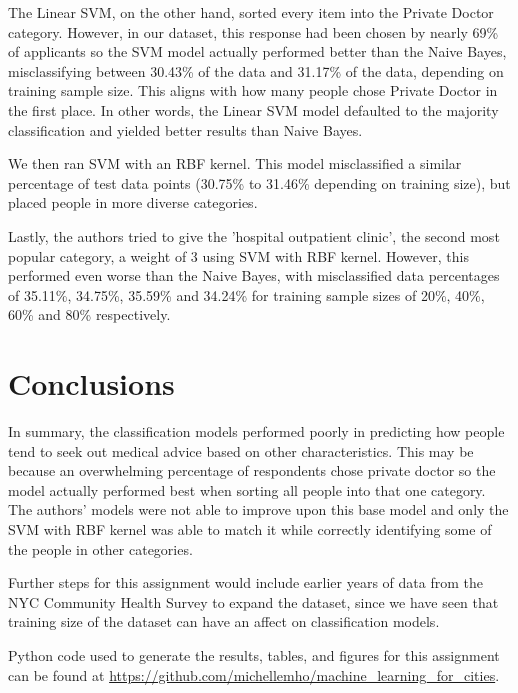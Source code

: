 \documentclass[10pt,twocolumn]{article}
\begin{document}
The Linear SVM, on the other hand, sorted
every item into the Private Doctor category. However, in our dataset, this response had been
chosen by nearly 69\% of applicants so the SVM model actually performed better
than the Naive Bayes, misclassifying between 30.43\% of the data and 31.17\% of the data, depending
on training sample size. This aligns with how many people chose Private Doctor in the first place.
In other words, the Linear SVM model defaulted to the majority classification and yielded better
results than Naive Bayes.

We then ran SVM with an RBF kernel. This model misclassified a similar
percentage of test data points (30.75\% to 31.46\% depending on training size),
but placed people in more diverse
categories.

Lastly, the authors tried to give the 'hospital outpatient clinic', the second
most popular category, a weight of 3 using SVM with RBF kernel. However, this
performed even worse than the Naive Bayes, with misclassified data percentages of
35.11\%, 34.75\%, 35.59\% and 34.24\% for training sample sizes of 20\%, 40\%, 60\% and
80\% respectively.

\section{Conclusions}

In summary, the classification models performed poorly in predicting
how people tend to seek out medical advice based on other characteristics. This
may be because an overwhelming percentage of respondents chose private doctor so
the model actually performed best when sorting all people into that one category.
The authors' models were not able to improve upon this base model and only the
SVM with RBF kernel was able to match it while correctly identifying some of the
people in other categories.

Further steps for this assignment would include earlier years of data from the
NYC Community Health Survey to expand the dataset, since we have seen that training
size of the dataset can have an affect on classification models.

Python code used to generate the results, tables, and figures for this assignment can be
found at \url{https://github.com/michellemho/machine_learning_for_cities}.
\end{document}
